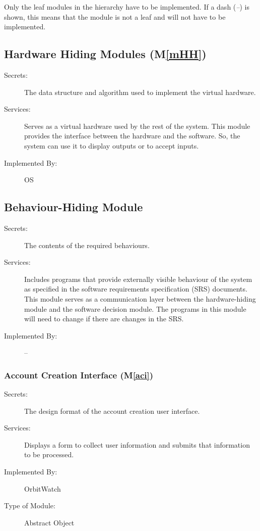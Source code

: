\documentclass[12pt, titlepage]{article}
\newcommand{\mref}[1]{M\ref{#1}}
\begin{document}
Only the leaf modules in the hierarchy have to be implemented. If a dash
(\emph{--}) is shown, this means that the module is not a leaf and will not have
to be implemented.

\subsection{Hardware Hiding Modules (\mref{mHH})}

\begin{description}
\item[Secrets:]The data structure and algorithm used to implement the virtual
  hardware.
\item[Services:]Serves as a virtual hardware used by the rest of the
  system. This module provides the interface between the hardware and the
  software. So, the system can use it to display outputs or to accept inputs.
\item[Implemented By:] OS
\end{description}

\subsection{Behaviour-Hiding Module}

\begin{description}
\item[Secrets:]The contents of the required behaviours.
\item[Services:]Includes programs that provide externally visible behaviour of
  the system as specified in the software requirements specification (SRS)
  documents. This module serves as a communication layer between the
  hardware-hiding module and the software decision module. The programs in this
  module will need to change if there are changes in the SRS.
\item[Implemented By:] --
\end{description}


\subsubsection{Account Creation Interface (\mref{aci})}

\begin{description}
\item[Secrets:]The design format of the account creation user interface.
\item[Services:] Displays a form to collect user information and submits that information to be processed.
\item[Implemented By:] OrbitWatch
\item[Type of Module:] Abstract Object
\end{description}
\end{document}
